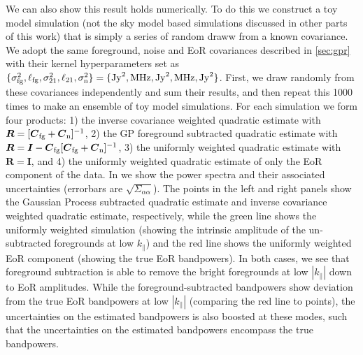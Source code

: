 \documentclass[a4paper,fleqn,usenatbib]{mnras}
\def\R{\boldsymbol{R}}
\def\Cfg{\boldsymbol{C}_{\rm fg}}
\def\Cn{\boldsymbol{C}_{\rm n}}
\def\I{\boldsymbol{I}}
\def\sigmafg{\sigma_{\rm fg}}
\def\ellfg{\ell_{\rm fg}}
\def\sigman{\sigma_{\rm n}}
\def\sigmato{\sigma_{\rm 21}}
\def\ellto{\ell_{\rm 21}}
\def\kpara{k_{\parallel}}
\begin{document}
We can also show this result holds numerically.
To do this we construct a toy model simulation (not the sky model based simulations discussed in other parts of this work) that is simply a series of random draww from a known covariance.
We adopt the same foreground, noise and EoR covariances described in \autoref{sec:gpr} with their kernel hyperparameters set as $\{\sigmafg^2, \ellfg, \sigmato^2, \ellto, \sigman^2\} = \{ {\rm Jy}^2, {\rm MHz}, {\rm Jy}^2, {\rm MHz}, {\rm Jy}^2\}$.
First, we draw randomly from these covariances independently and sum their results, and then repeat this 1000 times to make an ensemble of toy model simulations.
For each simulation we form four products: 1) the inverse covariance weighted quadratic estimate with $\R=[\Cfg + \Cn]^{-1}$, 2) the GP foreground subtracted quadratic estimate with $\R=\I - \Cfg[\Cfg + \Cn]^{-1}$, 3) the uniformly weighted quadratic estimate with $\R = \I$, and 4) the uniformly weighted quadratic estimate of only the EoR component of the data.
In we show the power spectra and their associated uncertainties (errorbars are $\sqrt{\Sigma_{\alpha\alpha}}$).
The points in the left and right panels show the Gaussian Process subtracted quadratic estimate and inverse covariance weighted quadratic estimate, respectively, while the green line shows the uniformly weighted simulation (showing the intrinsic amplitude of the un-subtracted foregrounds at low $\kpara$) and the red line shows the uniformly weighted EoR component (showing the true EoR bandpowers).
In both cases, we see that foreground subtraction is able to remove the bright foregrounds at low $|\kpara|$ down to EoR amplitudes.
While the foreground-subtracted bandpowers show deviation from the true EoR bandpowers at low $|\kpara|$ (comparing the red line to points), the uncertainties on the estimated bandpowers is also boosted at these modes, such that the uncertainties on the estimated bandpowers encompass the true bandpowers.
\end{document}
